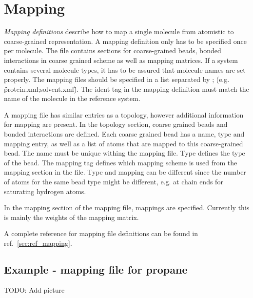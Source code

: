 \section{Mapping}
\label{sec:mapping}
{\em Mapping definitions} describe how to map a single molecule from atomistic to coarse-grained representation. A mapping definition only has to be specified once per molecule. The file contains sections for coarse-grained beads, bonded interactions in coarse grained scheme as well as mapping matrices. If a system contains several molecule types, it has to be assured that molecule names are set properly. The mapping files should be specified in a list separated by ; (e.g. \"protein.xml;solvent.xml\"). The ident tag in the mapping definition must match the name of the molecule in the reference system.

A mapping file has similar entries as a topology, however additional information for mapping are present. In the topology section, coarse grained beads and bonded interactions are defined. Each coarse grained bead has a name, type and mapping entry, as well as a list of atoms that are mapped to this coarse-grained bead. The name must be unique withing the mapping file. Type defines the type of the bead. The mapping tag defines which mapping scheme is used from the mapping section in the file. Type and mapping can be different since the number of atoms for the same bead type might be different, e.g. at chain ends for saturating hydrogen atoms.

In the mapping section of the mapping file, mappings are specified. Currently this is mainly the weights of the mapping matrix.

A complete reference for mapping file definitions can be found in ref.~\ref{sec:ref_mapping}.

\subsection{Example - mapping file for propane}
TODO: Add picture


